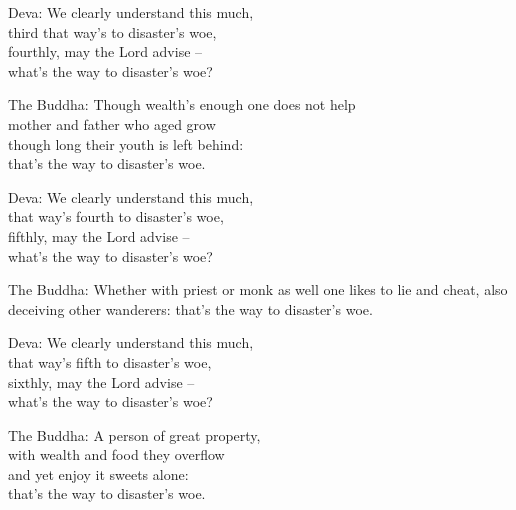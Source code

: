\begin{MyDescription}{Deva:}   
We clearly understand this much,\\
third that way's to disaster's woe,\\
fourthly, may the Lord advise – \\
what's the way to disaster's woe?
\end{MyDescription} 
   
\begin{MyDescription}{The Buddha:}   
Though wealth's enough one does not help\\
mother and father who aged grow\\
though long their youth is left behind:\\
that's the way to disaster's woe.
\end{MyDescription} 
   
\begin{MyDescription}{Deva:}   
We clearly understand this much,\\
that way's fourth to disaster's woe,\\
fifthly, may the Lord advise – \\
what's the way to disaster's woe?
\end{MyDescription}
   
\begin{MyDescription}{The Buddha:}   
Whether with priest or monk as well
one likes to lie and cheat, also
deceiving other wanderers:
that's the way to disaster's woe.
\end{MyDescription}

\begin{MyDescription}{Deva:}   
We clearly understand this much,\\
that way's fifth to disaster's woe,\\
sixthly, may the Lord advise – \\
what's the way to disaster's woe?
\end{MyDescription}

\begin{MyDescription}{The Buddha:}   
A person of great property,\\
with wealth and food they overflow\\
and yet enjoy it sweets alone:\\
that's the way to disaster's woe.
\end{MyDescription}

